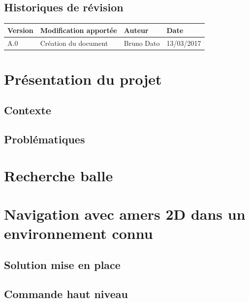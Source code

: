 \documentclass[10pt,a4paper]{article}
\begin{document}
\subsection*{Historiques de révision}

\begin{center}
    \begin{tabular}{| l | l | l | l |}
    \hline
     \rowcolor{gray} Version & Modification apportée & Auteur & Date \\ \hline
    A.0 & Création du document & Bruno Dato & 13/03/2017\\ \hline
     
    \end{tabular}
\end{center}

\newpage
\tableofcontents
\newpage
	

\section{Présentation du projet}
\label{sec:presentation}

\subsection{Contexte}

\subsection{Problématiques}

\newpage
\section{Recherche balle}
\label{sec:recherche_balle}

\newpage
\section{Navigation avec amers 2D dans un environnement connu}
\label{sec:navigation_avec_amers_2D_dans_un_environnement_connu}

\subsection{Solution mise en place}
\label{sec:solution_mise_en_place}

\subsection{Commande haut niveau}
\label{sec:commande_haut_niveau}
\end{document}
